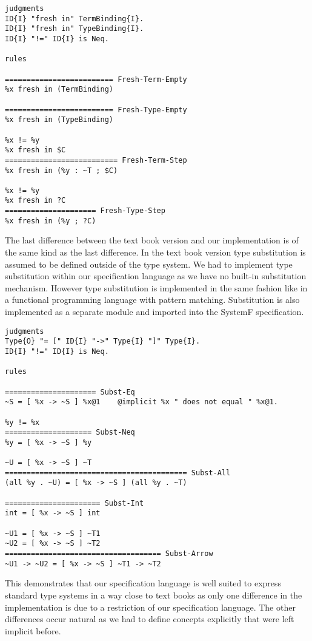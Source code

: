 \begin{lstlisting}[language=sltc]
judgments 
ID{I} "fresh in" TermBinding{I}.
ID{I} "fresh in" TypeBinding{I}.
ID{I} "!=" ID{I} is Neq.

rules

========================= Fresh-Term-Empty
%x fresh in (TermBinding)

========================= Fresh-Type-Empty
%x fresh in (TypeBinding)

%x != %y
%x fresh in $C
========================== Fresh-Term-Step
%x fresh in (%y : ~T ; $C)

%x != %y
%x fresh in ?C
===================== Fresh-Type-Step
%x fresh in (%y ; ?C)
\end{lstlisting}

The last difference between the text book version and our
implementation is of the same kind as the last difference. In the text
book version type substitution is assumed to be defined outside of the
type system. We had to implement type substitution within our
specification language as we have no built-in substitution
mechanism. However type substitution is implemented in the same
fashion like in a functional programming language with pattern
matching. Substitution is also implemented as a separate module and
imported into the SystemF specification.

\begin{lstlisting}[language=sltc]
judgments
Type{O} "= [" ID{I} "->" Type{I} "]" Type{I}.
ID{I} "!=" ID{I} is Neq.

rules

===================== Subst-Eq
~S = [ %x -> ~S ] %x@1    @implicit %x " does not equal " %x@1.

%y != %x
==================== Subst-Neq
%y = [ %x -> ~S ] %y

~U = [ %x -> ~S ] ~T
========================================== Subst-All
(all %y . ~U) = [ %x -> ~S ] (all %y . ~T)

====================== Subst-Int
int = [ %x -> ~S ] int

~U1 = [ %x -> ~S ] ~T1
~U2 = [ %x -> ~S ] ~T2
==================================== Subst-Arrow
~U1 -> ~U2 = [ %x -> ~S ] ~T1 -> ~T2
\end{lstlisting}

This demonstrates that our specification language is well suited to
express standard type systems in a way close to text books as only one
difference in the implementation is due to a restriction of our
specification language. The other differences occur natural as we had
to define concepts explicitly that were left implicit before.

